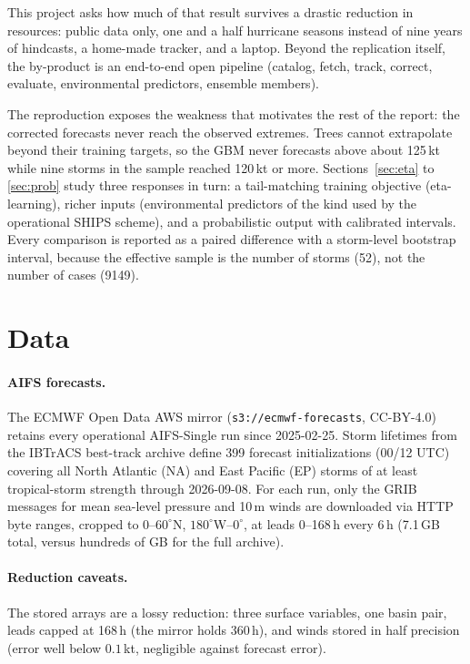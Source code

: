 \documentclass[11pt]{article}
\begin{document}
This project asks how much of that result survives a drastic reduction in resources: public data
only, one and a half hurricane seasons instead of nine years of hindcasts, a home-made tracker, and
a laptop. Beyond the replication itself, the by-product is an end-to-end open pipeline (catalog,
fetch, track, correct, evaluate, environmental predictors, ensemble members).

The reproduction exposes the weakness that motivates the rest of the report: the corrected
forecasts never reach the observed extremes. Trees cannot extrapolate beyond their training
targets, so the GBM never forecasts above about 125\,kt while nine storms in the sample reached
120\,kt or more. Sections~\ref{sec:eta} to \ref{sec:prob} study three responses in turn: a
tail-matching training objective (eta-learning), richer inputs (environmental predictors of the
kind used by the operational SHIPS scheme), and a probabilistic output with calibrated intervals.
Every comparison is reported as a paired difference with a storm-level bootstrap interval, because
the effective sample is the number of storms (52), not the number of cases (9149).

\section{Data}

\paragraph{AIFS forecasts.} The ECMWF Open Data AWS mirror (\texttt{s3://ecmwf-forecasts},
CC-BY-4.0) retains every operational AIFS-Single run since 2025-02-25. Storm lifetimes from the
IBTrACS best-track archive \citep{knapp2010ibtracs} define 399 forecast initializations (00/12
UTC) covering all North Atlantic (NA) and East Pacific (EP) storms of at least tropical-storm
strength through 2026-09-08. For each run, only the GRIB messages for mean sea-level pressure and
10\,m winds are downloaded via HTTP byte ranges, cropped to $0$--$60^{\circ}$N,
$180^{\circ}$W--$0^{\circ}$, at leads 0--168\,h every 6\,h (7.1\,GB total, versus hundreds of GB
for the full archive).

\paragraph{Reduction caveats.} The stored arrays are a lossy reduction: three surface variables,
one basin pair, leads capped at 168\,h (the mirror holds 360\,h), and winds stored in half
precision (error well below $0.1$\,kt, negligible against forecast error).
\end{document}
